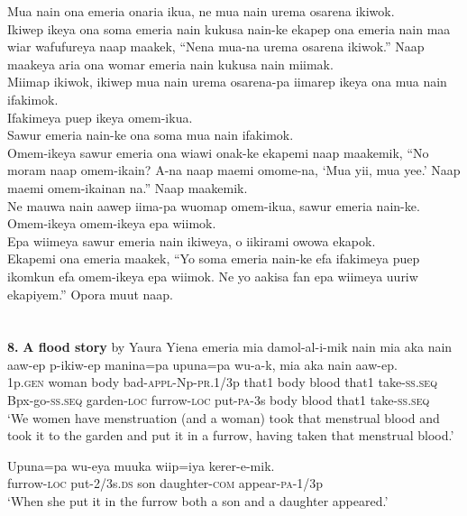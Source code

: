 {Mua nain ona emeria onaria ikua, ne mua nain urema osarena ikiwok. \\
\textrm{Ikiwep ikeya ona soma emeria nain kukusa nain-ke ekapep ona emeria nain maa wiar wafufureya naap maakek, “Nena mua-na urema osarena ikiwok.”  }
Naap maakeya aria ona womar emeria nain kukusa nain miimak. \\
Miimap ikiwok, ikiwep mua nain urema osarena-pa iimarep ikeya ona mua nain ifakimok. \\
Ifakimeya puep ikeya omem-ikua. \\
Sawur emeria nain-ke ona soma mua nain ifakimok. \\
\textrm{Omem-ikeya sawur emeria ona wiawi onak-ke ekapemi naap maakemik, “No moram naap omem-ikain?  }
\textrm{A-na naap maemi omome-na, ‘Mua yii, mua yee.’ }
\textrm{Naap maemi omem-ikainan na.”  }
Naap maakemik. \\
Ne mauwa nain aawep iima-pa wuomap omem-ikua, sawur emeria nain-ke. \\
Omem-ikeya omem-ikeya epa wiimok. \\
Epa wiimeya sawur emeria nain ikiweya, o iikirami owowa ekapok. \\
\textrm{Ekapemi ona emeria maakek, “Yo soma emeria nain-ke efa ifakimeya puep ikomkun efa omem-ikeya epa wiimok.  }
\textrm{Ne yo aakisa fan epa wiimeya uuriw ekapiyem.”  }
Opora muut naap. \\
\section{}
\textbf{8.}  \textbf{A flood story}  by Yaura
\ea\label{ex:a:x1}
\gll  Yiena  emeria  mia  damol-al-i-mik  nain  mia  aka  nain      aaw-ep  p-ikiw-ep  manina=pa  upuna=pa  wu-a-k,               mia  aka  nain  aaw-ep. \\
1p.\textsc{gen}  woman  body  bad-\textsc{appl}-Np-\textsc{pr}.1/3p  that1  body  blood  that1 take-\textsc{ss.seq}  Bpx-go-\textsc{ss.seq}  garden-\textsc{loc}  furrow-\textsc{loc}  put-\textsc{pa}-3s body  blood  that1  take-\textsc{ss.seq} \\




\glt ‘We women have menstruation (and a woman) took that menstrual blood and took it to the garden and put it in a furrow, having taken that menstrual blood.’ \\
\z


\ea\label{ex:a:x2}
\gll  Upuna=pa  wu-eya  muuka  wiip=iya  kerer-e-mik. \\
furrow-\textsc{loc}  put-2/3s.\textsc{ds}  son  daughter-\textsc{com}  appear-\textsc{pa}-1/3p \\
\glt ‘When she put it in the furrow both a son and a daughter appeared.’ \\
\z


}

